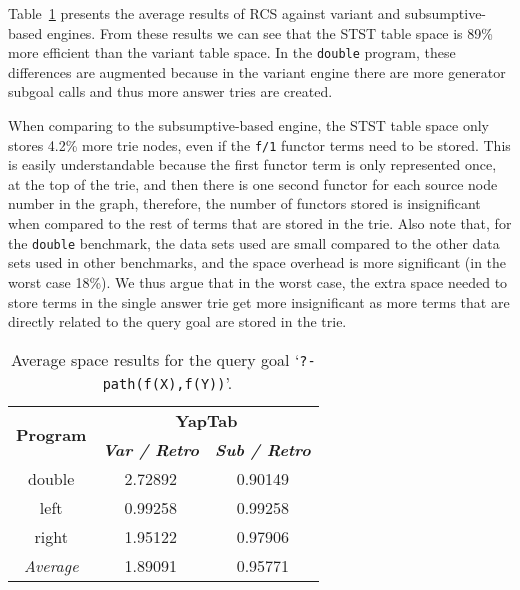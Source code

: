 Table~\ref{tbl:results_average_stst_space} presents the average results of RCS against variant and
subsumptive-based engines. From these results we can see that the STST table space is 89\% more efficient
than the variant table space. In the \texttt{double} program, these differences are augmented because in the
variant engine there are more generator subgoal calls and thus more answer tries are created.

When comparing to the subsumptive-based engine, the STST table space only stores 4.2\% more trie nodes,
even if the \texttt{f/1} functor terms need to be stored. This is easily understandable because
the first functor term is only represented once, at the top of the trie, and then there is one second functor
for each source node number in the graph, therefore, the number of functors stored is insignificant when
compared to the rest of terms that are stored in the trie. Also note that, for the \texttt{double} benchmark,
the data sets used are small compared to the other data sets used in other benchmarks, and the space overhead
is more significant (in the worst case 18\%). We thus argue that in the worst case,
the extra space needed to store terms in the single answer trie get more insignificant as more terms
that are directly related to the query goal are stored in the trie.

\begin{table}[ht]
\centering
  \begin{tabular}{ccc}
   \hline
    \hline
    \multirow{2}{*}{\textbf{Program}} & \multicolumn{2}{c}{\textbf{YapTab}} \\
    & \textbf{\textit{\small{Var / Retro}}} & \textbf{\textit{\small{Sub / Retro}}} \\
   \hline
   \hline
double & 2.72892 & 0.90149 \\
left & 0.99258 & 0.99258 \\
right & 1.95122 & 0.97906 \\
\hline
\hline
\textit{Average} & 1.89091 &  0.95771 \\
\hline
\hline
\end{tabular}
\caption{Average space results for the query goal `\texttt{?-~path(f(X),f(Y))}'.}
\label{tbl:results_average_stst_space}
\end{table}

